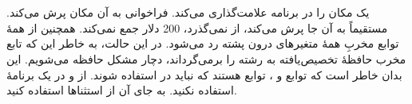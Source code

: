 \section{}
\paragraph{}\label{answer:66}
 یک مکان را در برنامه علامت‌گذاری می‌کند. فراخوانی  به آن مکان پرش می‌کند. مستقیماً به آن جا پرش می‌کند، از  نمی‌گذرد، 200 دلار جمع نمی‌کند. همچنین از همهٔ توابع مخربِ همهٔ متغیرهای درون پشته رد می‌شود. در این حالت، به خاطر این که تابع مخرب  حافظهٔ تخصیص‌یافته به رشته را برمی‌گرداند، دچار مشکل حافظه می‌شویم. این بدان خاطر است که توابع  و ، توابع  هستند که نباید در  استفاده شوند. از  و  در یک برنامهٔ  استفاده نکنید. به جای آن از استثناها استفاده کنید.
